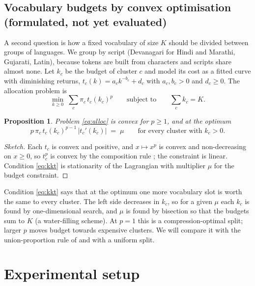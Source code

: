 \documentclass[11pt,a4paper]{article}
\newtheorem{proposition}{Proposition}
\theoremstyle{remark}
\begin{document}
\subsection{Vocabulary budgets by convex optimisation (formulated, not yet evaluated)}\label{sec:alloc}

A second question is how a fixed vocabulary of size $K$ should be divided between groups of
languages. We group by script (Devanagari for Hindi and Marathi, Gujarati, Latin), because
tokens are built from characters and scripts share almost none. Let $k_c$ be the budget of
cluster $c$ and model its cost as a fitted curve with diminishing returns,
$t_c(k)=a_c k^{-b_c}+d_c$ with $a_c,b_c>0$ and $d_c\ge0$. The allocation problem is
\begin{equation}\label{eq:alloc}
  \min_{k\ge0}\; \sum_c \pi_c\, t_c(k_c)^{p}
  \qquad\text{subject to}\qquad \sum_c k_c = K .
\end{equation}

\begin{proposition}
Problem \eqref{eq:alloc} is convex for $p\ge1$, and at the optimum
\begin{equation}\label{eq:kkt}
  p\,\pi_c\, t_c(k_c)^{p-1}\,\bigl|t_c'(k_c)\bigr| \;=\; \mu \qquad\text{for every cluster with } k_c>0 .
\end{equation}
\end{proposition}

\begin{proof}[Sketch]
Each $t_c$ is convex and positive, and $x\mapsto x^p$ is convex and non-decreasing on
$x\ge0$, so $t_c^p$ is convex by the composition rule \cite{boyd2004}; the constraint is
linear. Condition \eqref{eq:kkt} is stationarity of the Lagrangian with multiplier $\mu$ for
the budget constraint.
\end{proof}

Condition \eqref{eq:kkt} says that at the optimum one more vocabulary slot is worth the same
to every cluster. The left side decreases in $k_c$, so for a given $\mu$ each $k_c$ is found
by one-dimensional search, and $\mu$ is found by bisection so that the budgets sum to $K$
(a water-filling scheme). At $p=1$ this is a compression-optimal split; larger $p$ moves
budget towards expensive clusters. We will compare it with the union-proportion rule of
\cite{brahma2026} and with a uniform split.

\section{Experimental setup}
\end{document}
